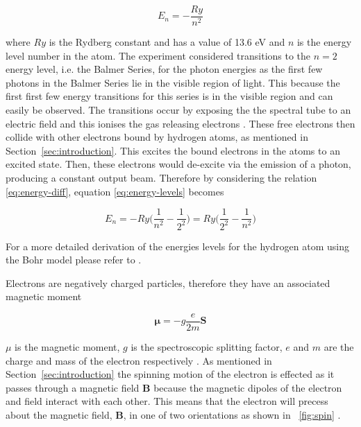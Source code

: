 \documentclass{article}
\newcommand{\figref}[2][\figurename~]{#1\ref{#2}}
\newcommand{\secref}[2][Section~]{#1\ref{#2}}
\begin{document}
\begin{equation}
\label{eq:energy-levels}
E_n = -\frac{Ry}{n^2}
\end{equation}

\vspace{2mm}
\noindent
where $Ry$ is the Rydberg constant and has a value of 13.6 eV and $n$ is the energy level number in the atom. The experiment considered transitions to the $n = 2$ energy level, i.e. the Balmer Series, for the photon energies as the first few photons in the Balmer Series lie in the visible region of light. This because the first first few energy transitions for this series is in the visible region and can easily be observed. The transitions occur by exposing the the spectral tube to an electric field and this ionises the gas releasing electrons \cite{Paper01}. These free electrons then collide with other electrons bound by hydrogen atoms, as mentioned in \secref{sec:introduction}. This excites the bound electrons in the atoms to an excited state. Then, these electrons would de-excite via the emission of a photon, producing a constant output beam. Therefore by considering the relation \eqref{eq:energy-diff}, equation \eqref{eq:energy-levels} becomes

\begin{equation}
\label{eq:balmer-series}
E_n = -Ry\Bigg(\frac{1}{n^2} - \frac{1}{2^2}\Bigg) = Ry\Bigg(\frac{1}{2^2} - \frac{1}{n^2}\Bigg)
\end{equation}

\vspace{2mm}
\noindent
For a more detailed derivation of the energies levels for the hydrogen atom using the Bohr model please refer to \cite{Book02}.

\vspace{2mm}
\noindent
Electrons are negatively charged particles, therefore they have an associated magnetic moment

\begin{equation}
\label{eq:magnetic-moment}
\boldsymbol{\mu} = -g\frac{e}{2m}\textbf{S}
\end{equation}

\vspace{2mm}
\noindent
\textbf{$\mu$} is the magnetic moment, $g$ is the spectroscopic splitting factor, $e$ and $m$ are the charge and mass of the electron respectively \cite{Paper02}. As mentioned in \secref{sec:introduction} the spinning motion of the electron is effected as it passes through a magnetic field \textbf{B} because the magnetic dipoles of the electron and field interact with each other. This means that the electron will precess about the magnetic field, \textbf{B}, in one of two orientations as shown in \figref{fig:spin} \cite{Paper02}.
\end{document}
